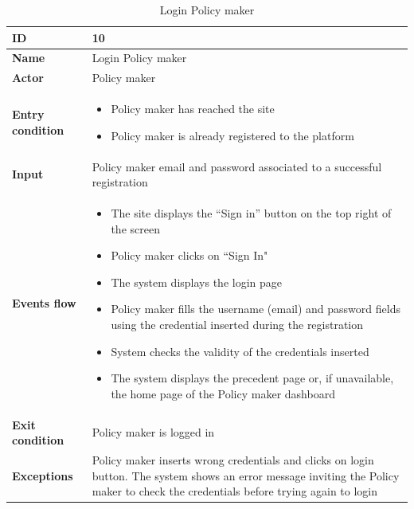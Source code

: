 \begin{longtable}{p{} | p{}}
\caption{Login Policy maker}
        \label{tab:login_policy_maker}\\
        \hline
        \textbf{ID} & 10\\
        \hline
        \textbf{Name}  &  Login Policy maker \\
        \hline
        \textbf{Actor}  &  Policy maker\\
        \hline
        \textbf{Entry condition}  &  
        \begin{itemize}
                \item Policy maker has reached the site
                \item Policy maker is already registered to the platform
         \end{itemize}\\
        \hline
        \textbf{Input}  & Policy maker email and password associated to a successful registration\\ 
        \hline
        \textbf{Events flow} & 
        \begin{itemize}
                \item The site displays the “Sign in” button on the top right of the screen
                \item Policy maker clicks on “Sign In"
                \item The system displays the login page
                \item Policy maker fills the username (email) and password fields using the credential inserted during the registration
                \item System checks the validity of the credentials inserted
                \item The system displays the precedent page or, if unavailable, the home page of the Policy maker dashboard
                 \end{itemize}
                 \\
        \hline
        \textbf{Exit condition} & Policy maker is logged in\\
        \hline
        \textbf{Exceptions} & Policy maker inserts wrong credentials and clicks on login button. The system shows an error message inviting the Policy maker to check the credentials before trying again to login\\
        \hline
       
        
    \end{longtable}
    
